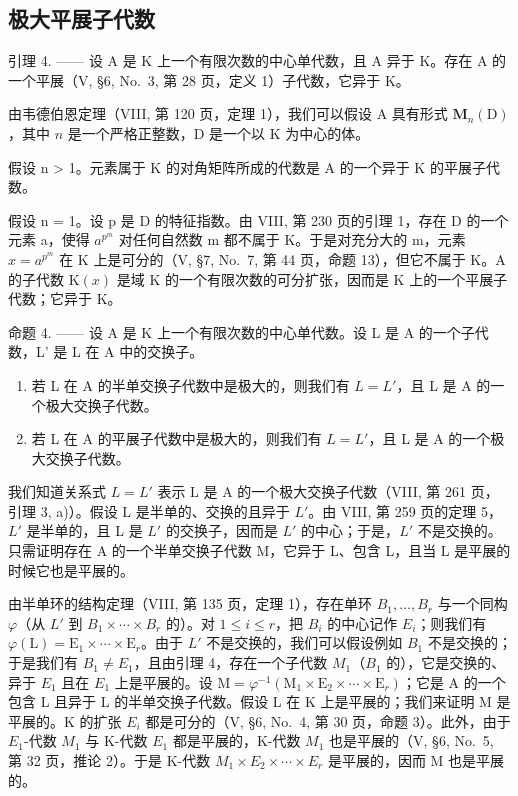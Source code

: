 \subsection{极大平展子代数}

引理 4. —— 设 A 是 K 上一个有限次数的中心单代数，且 A 异于 K。存在 A 的一个平展（V, §6, No.~3, 第 28 页，定义 1）子代数，它异于 K。

由韦德伯恩定理（VIII, 第 120 页，定理 1），我们可以假设 \(\mathrm{A}\) 具有形式 \(\mathbf{M}_n(\mathrm{D})\)，其中 \(n\) 是一个严格正整数，\(\mathrm{D}\) 是一个以 \(\mathrm{K}\) 为中心的体。

假设 n \textgreater{} 1。元素属于 K 的对角矩阵所成的代数是 A 的一个异于 K 的平展子代数。

假设 n = 1。设 p 是 D 的特征指数。由 VIII, 第 230 页的引理 1，存在 D 的一个元素 a，使得 \(a^{p^{m}}\) 对任何自然数 m 都不属于 K。于是对充分大的 m，元素 \(x = a^{p^{m}}\) 在 K 上是可分的（V, §7, No.~7, 第 44 页，命题 13），但它不属于 K。A 的子代数 \(\mathrm{K}(x)\) 是域 K 的一个有限次数的可分扩张，因而是 K 上的一个平展子代数；它异于 K。

命题 4. —— 设 A 是 K 上一个有限次数的中心单代数。设 L 是 A 的一个子代数，L' 是 L 在 A 中的交换子。

\begin{enumerate}
\def\labelenumi{\alph{enumi})}
\item
  若 L 在 A 的半单交换子代数中是极大的，则我们有 \(L = L'\)，且 L 是 A 的一个极大交换子代数。
\item
  若 L 在 A 的平展子代数中是极大的，则我们有 \(L = L'\)，且 L 是 A 的一个极大交换子代数。
\end{enumerate}

我们知道关系式 \(L = L'\) 表示 L 是 A 的一个极大交换子代数（VIII, 第 261 页，引理 3, a)）。假设 L 是半单的、交换的且异于 \(L'\)。由 VIII, 第 259 页的定理 5，\(L'\) 是半单的，且 L 是 \(L'\) 的交换子，因而是 \(L'\) 的中心；于是，\(L'\) 不是交换的。只需证明存在 A 的一个半单交换子代数 M，它异于 L、包含 L，且当 L 是平展的时候它也是平展的。

由半单环的结构定理（VIII, 第 135 页，定理 1），存在单环 \(B_{1},\ldots,B_{r}\) 与一个同构 \(\varphi\)（从 \(L'\) 到 \(B_{1}\times\cdots\times B_{r}\) 的）。对 \(1\leqslant i\leqslant r\)，把 \(B_{i}\) 的中心记作 \(E_{i}\)；则我们有 \(\varphi(\mathrm{L})=\mathrm{E}_{1}\times\cdots\times\mathrm{E}_{r}\)。由于 \(L'\) 不是交换的，我们可以假设例如 \(B_{1}\) 不是交换的；于是我们有 \(B_{1}\neq E_{1}\)，且由引理 4，存在一个子代数 \(M_{1}\)（\(B_{1}\) 的），它是交换的、异于 \(E_{1}\) 且在 \(E_{1}\) 上是平展的。设 \(\mathrm{M} = \varphi^{-1}(\mathrm{M}_{1} \times \mathrm{E}_{2} \times \cdots \times \mathrm{E}_{r})\)；它是 A 的一个包含 L 且异于 L 的半单交换子代数。假设 L 在 K 上是平展的；我们来证明 M 是平展的。K 的扩张 \(E_{i}\) 都是可分的（V, §6, No.~4, 第 30 页，命题 3）。此外，由于 \(E_{1}\)-代数 \(M_{1}\) 与 K-代数 \(E_{1}\) 都是平展的，K-代数 \(M_{1}\) 也是平展的（V, §6, No.~5, 第 32 页，推论 2）。于是 K-代数 \(M_{1} \times E_{2} \times \cdots \times E_{r}\) 是平展的，因而 M 也是平展的。


